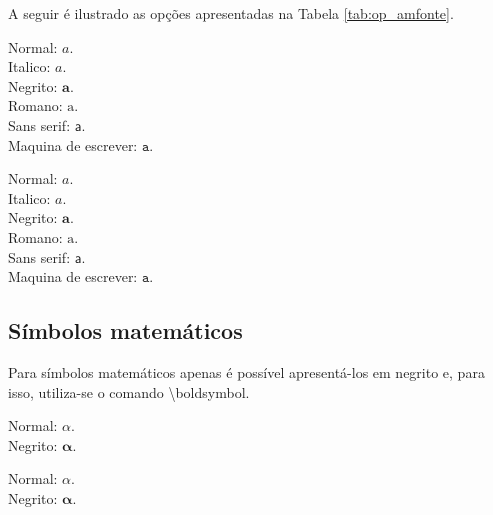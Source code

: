 A seguir é ilustrado as opções apresentadas na Tabela \ref{tab:op_amfonte}. \\
\begin{minipage}[t]{0.47\linewidth} \vspace{-8pt}
    \begin{latexcode}
        Normal: $a$. \\
        Italico: $\mathit{a}$. \\
        Negrito: $\mathbf{a}$. \\
        Romano: $\mathrm{a}$. \\
        Sans serif: $\mathsf{a}$. \\
        Maquina de escrever: $\mathtt{a}$.
    \end{latexcode}
\end{minipage} \hfill
\begin{minipage}[t]{0.47\linewidth}
    \vspace{0pt}
    Normal: $a$. \\
    Italico: $\mathit{a}$. \\
    Negrito: $\mathbf{a}$. \\
    Romano: $\mathrm{a}$. \\
    Sans serif: $\mathsf{a}$. \\
    Maquina de escrever: $\mathtt{a}$.
\end{minipage}

\subsection{Símbolos matemáticos}
Para símbolos matemáticos apenas é possível apresentá-los em negrito e, para isso, utiliza-se o comando \textsf{\textbackslash boldsymbol}. \\
\begin{minipage}[t]{0.47\linewidth} \vspace{-8pt}
    \begin{latexcode}
        Normal: $\alpha$. \\
        Negrito: $\boldsymbol{\alpha}$.
    \end{latexcode}
\end{minipage} \hfill
\begin{minipage}[t]{0.47\linewidth}
    \vspace{0pt}
    Normal: $\alpha$. \\
    Negrito: $\boldsymbol{\alpha}$.
\end{minipage}

